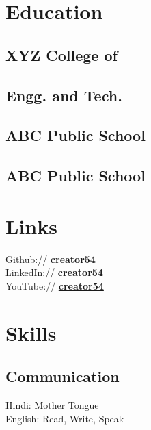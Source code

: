 \documentclass[]{deedy-resume-openfont}
\begin{document}
\begin{minipage}[t]{0.32\textwidth} 


\section{Education} 

\subsection{XYZ College of}
\subsection{Engg. and Tech.}
\sectionsep

\subsection{ABC Public School}
\sectionsep

\subsection{ABC Public School}
\sectionsep


\section{Links} 
Github:// \href{https://github.com/creator54}{\bf creator54} \\
LinkedIn:// \href{https://www.linkedin.com/in/creator54}{\bf creator54} \\
YouTube:// \href{https://www.youtube.com/user/creator54}{\bf creator54} \\


\section{Skills}
\subsection{Communication}
\textbullet{}Hindi: Mother Tongue\\
\textbullet{}English: Read, Write, Speak
\sectionsep


\end{minipage}
\end{document}
